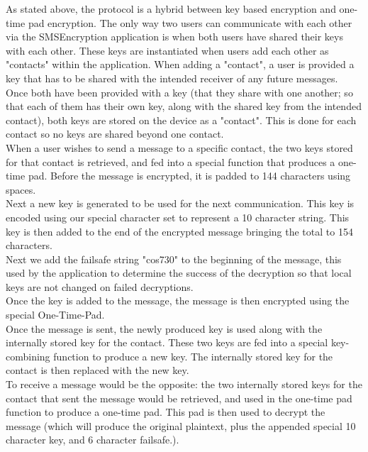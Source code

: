 As stated above, the protocol is a hybrid between key based encryption and one-time pad encryption. The only way two users can communicate with each other via the SMSEncryption application is when both users have shared their keys with each other. These keys are instantiated when users add each other as "contacts" within the application. When adding a "contact", a user is provided a key that has to be shared with the intended receiver of any future messages. Once both have been provided with a key (that they share with one another; so that each of them has their own key, along with the shared key from the intended contact), both keys are stored on the device as a "contact". This is done for each contact so no keys are shared beyond one contact.
\vspace{10pt}\\
When a user wishes to send a message to a specific contact, the two keys stored for that contact is retrieved, and fed into a special function that produces a one-time pad. Before the message is encrypted, it is padded to 144 characters using spaces.
\vspace{10pt}\\
Next a new key is generated to be used for the next communication. This key is encoded using our special character set to represent a 10 character string. This key is then added to the end of the encrypted message bringing the total to 154 characters.
\vspace{10pt}\\
Next we add the failsafe string "cos730" to the beginning of the message, this used by the application to determine the success of the decryption so that local keys are not changed on failed decryptions.
\vspace{10pt}\\
Once the key is added to the message, the message is then encrypted using the special One-Time-Pad.
\vspace{10pt}\\
Once the message is sent, the newly produced key is used along with the internally stored key for the contact. These two keys are fed into a special key-combining function to produce a new key. The internally stored key for the contact is then replaced with the new key.
\vspace{10pt}\\
To receive a message would be the opposite: the two internally stored keys for the contact that sent the message would be retrieved, and used in the one-time pad function to produce a one-time pad. This pad is then used to decrypt the message (which will produce the original plaintext, plus the appended special 10 character key, and 6 character failsafe.).
